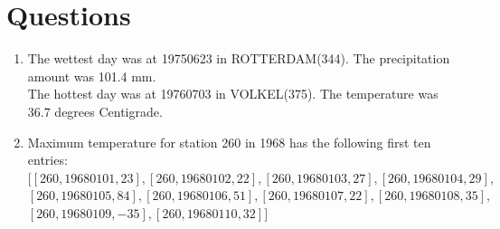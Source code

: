 \documentclass[a4paper]{article}
\begin{document}
\section{Questions}
\begin{enumerate}
\item
The wettest day was at 19750623 in ROTTERDAM(344). The precipitation amount was 101.4 mm. \\
The hottest day was at 19760703 in VOLKEL(375). The temperature was 36.7 degrees Centigrade. \\
\item
Maximum temperature for station 260 in 1968 has the following first ten entries:\\
$[[260, 19680101, 23], [260, 19680102, 22], [260, 19680103, 27], [260, 19680104, 29],$ \\
$[260, 19680105, 84], [260, 19680106, 51], [260, 19680107, 22], [260, 19680108, 35],$\\
$[260, 19680109, -35], [260, 19680110, 32]]$


\end{enumerate}
\end{document}
